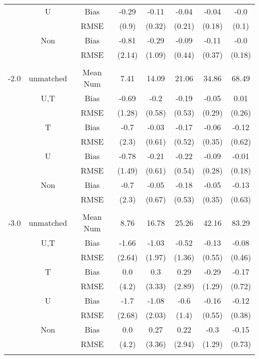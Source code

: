 \begin{tabular}{@{\extracolsep{5pt}}lc|cccccc}
 & U & Bias & -0.29 & -0.11 & -0.04 & -0.04 & -0.0 \\
 &  & RMSE & (0.9) & (0.32) & (0.21) & (0.18) & (0.1) \\
 & Non & Bias & -0.81 & -0.29 & -0.09 & -0.11 & -0.0 \\
 &  & RMSE & (2.14) & (1.09) & (0.44) & (0.37) & (0.18) \\
 &  &  &  &  &  &  &  \\
-2.0 & unmatched & Mean Num & 7.41 & 14.09 & 21.06 & 34.86 & 68.49 \\
 & U,T & Bias & -0.69 & -0.2 & -0.19 & -0.05 & 0.01 \\
 &  & RMSE & (1.28) & (0.58) & (0.53) & (0.29) & (0.26) \\
 & T & Bias & -0.7 & -0.03 & -0.17 & -0.06 & -0.12 \\
 &  & RMSE & (2.3) & (0.61) & (0.52) & (0.35) & (0.62) \\
 & U & Bias & -0.78 & -0.21 & -0.22 & -0.09 & -0.01 \\
 &  & RMSE & (1.49) & (0.61) & (0.54) & (0.28) & (0.18) \\
 & Non & Bias & -0.7 & -0.05 & -0.18 & -0.05 & -0.13 \\
 &  & RMSE & (2.3) & (0.67) & (0.53) & (0.35) & (0.63) \\
 &  &  &  &  &  &  &  \\
-3.0 & unmatched & Mean Num & 8.76 & 16.78 & 25.26 & 42.16 & 83.29 \\
 & U,T & Bias & -1.66 & -1.03 & -0.52 & -0.13 & -0.08 \\
 &  & RMSE & (2.64) & (1.97) & (1.36) & (0.55) & (0.46) \\
 & T & Bias & 0.0 & 0.3 & 0.29 & -0.29 & -0.17 \\
 &  & RMSE & (4.2) & (3.33) & (2.89) & (1.29) & (0.72) \\
 & U & Bias & -1.7 & -1.08 & -0.6 & -0.16 & -0.12 \\
 &  & RMSE & (2.68) & (2.03) & (1.4) & (0.55) & (0.38) \\
 & Non & Bias & 0.0 & 0.27 & 0.22 & -0.3 & -0.15 \\
 &  & RMSE & (4.2) & (3.36) & (2.94) & (1.29) & (0.73) \\
 &  &  &  &  &  &  &  \\
\hline 
\bottomrule 
\end{tabular}
